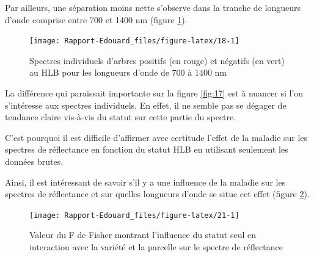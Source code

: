 \documentclass[
  11pt,
  french,
  a4paper,
  extrafontsizes,onecolumn,openright
  ]{memoir}
\begin{document}
Par ailleurs, une séparation moins nette s'observe dans la tranche de longueurs d'onde comprise entre 700 et 1400 nm (figure \ref{fig:18}).

\scriptsize

\begin{figure}

{\centering \texttt{[image: Rapport-Edouard\_files/figure-latex/18-1]} 

}

\caption{Spectres individuels d’arbres positifs (en rouge) et négatifs (en vert) au HLB pour les longueurs d’onde de 700 à 1400 nm}\label{fig:18}
\end{figure}

\normalsize

La différence qui paraissait importante sur la figure \ref{fig:17} est à nuancer si l'on s'intéresse aux spectres individuels. En effet, il ne semble pas se dégager de tendance claire vis-à-vis du statut sur cette partie du spectre.

C'est pourquoi il est difficile d'affirmer avec certitude l'effet de la maladie sur les spectres de réflectance en fonction du statut HLB en utilisant seulement les données brutes.

Ainsi, il est intéressant de savoir s'il y a une influence de la maladie sur les spectres de réflectance et sur quelles longueurs d'onde se situe cet effet (figure \ref{fig:21}).

\scriptsize

\begin{figure}

{\centering \texttt{[image: Rapport-Edouard\_files/figure-latex/21-1]} 

}

\caption{Valeur du F de Fisher montrant l’influence du statut seul en interaction avec la variété et la parcelle sur le spectre de réflectance}\label{fig:21}
\end{figure}
\end{document}
